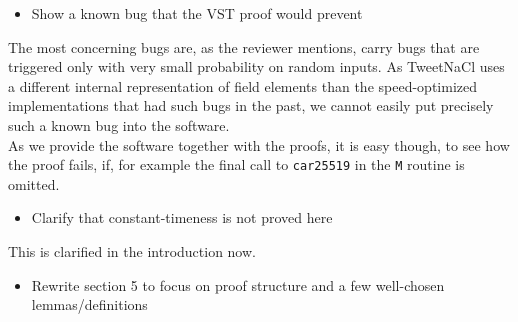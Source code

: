 \begin{center}
\end{center}

\begin{itemize}
    \item Show a known bug that the VST proof would prevent
\end{itemize}
\begin{answer}
  The most concerning bugs are, as the reviewer mentions, carry bugs that are triggered only with
  very small probability on random inputs. As TweetNaCl uses a different internal representation
  of field elements than the speed-optimized implementations that had such bugs in the past, we 
  cannot easily put precisely such a known bug into the software.\\ 
  As we provide the software together with the proofs, it is easy though, to see how the proof fails, 
  if, for example the final call to \texttt{car25519} in the \texttt{M} routine is omitted.
\end{answer}
\begin{itemize}
    \item Clarify that constant-timeness is not proved here
\end{itemize}
\begin{answer}
  This is clarified in the introduction now.
\end{answer}
\begin{itemize}
    \item Rewrite section 5 to focus on proof structure and a few well-chosen lemmas/definitions
\end{itemize}
\begin{answer}
\end{answer}

